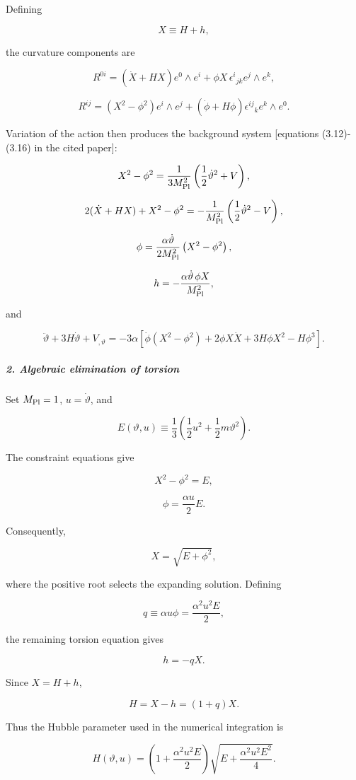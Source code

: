 Defining

\[
X\equiv H+h,
\]

the curvature components are

\[
R^{0i} = \left(\dot X+HX\right)e^0\wedge e^i + \phi X\,\epsilon^i{}_{jk}e^j\wedge e^k,
\]

\[
R^{ij} = \left(X^2-\phi^2\right)e^i\wedge e^j + (\dot\phi+H\phi)\epsilon^{ij}{}_k e^k\wedge e^0.
\]

Variation of the action then produces the background system [equations (3.12)-(3.16) in the cited paper]:

\[
X^2-\phi^2 = \frac{1}{3M_{\rm Pl}^2} \left(\frac12\dot\vartheta^2+V\right),
\]

\[
2(\dot X+HX)+X^2-\phi^2 = -\frac{1}{M_{\rm Pl}^2} \left(\frac12\dot\vartheta^2-V\right),
\]

\[
\phi = \frac{\alpha\dot\vartheta}{2M_{\rm Pl}^2} \left(X^2-\phi^2\right),
\]

\[
h = -\frac{\alpha\dot\vartheta\,\phi X}{M_{\rm Pl}^2},
\]

and

\[
\ddot\vartheta+3H\dot\vartheta+V_{,\vartheta} = -3\alpha \left[ \dot\phi(X^2-\phi^2) +2\phi X\dot X +3H\phi X^2-H\phi^3 \right].
\]

\subparagraph*{2. Algebraic elimination of torsion}

Set $M_{\rm Pl}=1$, $u=\dot\vartheta$, and

\[
E(\vartheta,u) \equiv \frac13\left(\frac12u^2+\frac12m\vartheta^2\right).
\]

The constraint equations give

\[
X^2-\phi^2=E,
\]

\[
\phi=\frac{\alpha u}{2}E.
\]

Consequently,

\[
X=\sqrt{E+\phi^2},
\]

where the positive root selects the expanding solution. Defining

\[
q\equiv\alpha u\phi =\frac{\alpha^2u^2E}{2},
\]

the remaining torsion equation gives

\[
h=-qX.
\]

Since $X=H+h$,

\[
H=X-h=(1+q)X.
\]

Thus the Hubble parameter used in the numerical integration is

\[
{ H(\vartheta,u) = \left(1+\frac{\alpha^2u^2E}{2}\right) \sqrt{ E+\frac{\alpha^2u^2E^2}{4} } }.
\]

